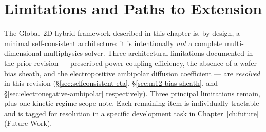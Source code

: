 \documentclass[11pt,a4paper]{report}
\begin{document}
\section{Limitations and Paths to Extension}
\label{sec:hybrid-limits}

The Global--2D hybrid framework described in this chapter is, by design, a minimal self-consistent architecture: it is intentionally \emph{not} a complete multi-dimensional multiphysics solver.  Three architectural limitations documented in the prior revision --- prescribed power-coupling efficiency, the absence of a wafer-bias sheath, and the electropositive ambipolar diffusion coefficient --- are \emph{resolved} in this revision (\S\ref{sec:selfconsistent-eta}, \S\ref{sec:m12-bias-sheath}, and \S\ref{sec:electronegative-ambipolar} respectively).  Three principal limitations remain, plus one kinetic-regime scope note.  Each remaining item is individually tractable and is tagged for resolution in a specific development task in Chapter~\ref{ch:future} (Future Work).
\end{document}
